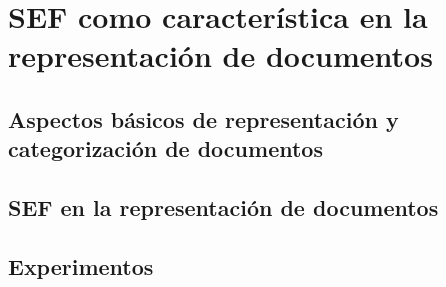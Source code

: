 \chapter{SEF como caracter\'istica en la representaci\'on de documentos}
\section{Aspectos b\'asicos de representaci\'on y categorizaci\'on de documentos}
\section{SEF en la representaci\'on de documentos}
\section{Experimentos} 